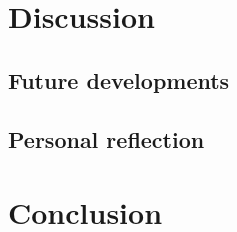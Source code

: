 \documentclass[12pt,onecolumn]{article}
\begin{document}
\newpage
\section{Discussion}
\label{sec:discussion}

\subsection{Future developments}

\subsection{Personal reflection}

\newpage
\section{Conclusion}
\label{sec:conclusion}

\newpage


\end{document}
